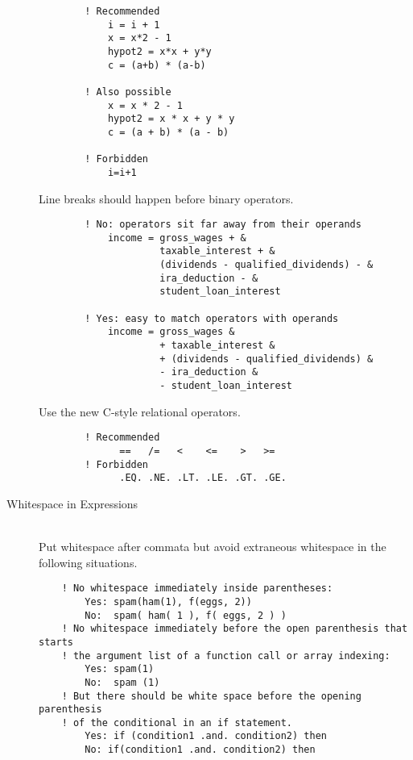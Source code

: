\documentclass[a4paper,notitlepage]{scrreprt}
\newcommand\headitem[1]{\needspace{1.5\baselineskip}\item[{\boldmath #1 \nopagebreak}] \hfill \\ \nopagebreak}
\begin{document}
\begin{description}
        \begin{lstlisting}
        ! Recommended
            i = i + 1
            x = x*2 - 1
            hypot2 = x*x + y*y
            c = (a+b) * (a-b)

        ! Also possible
            x = x * 2 - 1
            hypot2 = x * x + y * y
            c = (a + b) * (a - b)

        ! Forbidden
            i=i+1
        \end{lstlisting}

        Line breaks should happen before binary operators.
        \begin{lstlisting}
        ! No: operators sit far away from their operands
            income = gross_wages + &
                     taxable_interest + &
                     (dividends - qualified_dividends) - &
                     ira_deduction - &
                     student_loan_interest

        ! Yes: easy to match operators with operands
            income = gross_wages &
                     + taxable_interest &
                     + (dividends - qualified_dividends) &
                     - ira_deduction &
                     - student_loan_interest
        \end{lstlisting}

        Use the new C-style relational operators.
        \begin{lstlisting}
        ! Recommended
              ==   /=   <    <=    >   >=
        ! Forbidden
              .EQ. .NE. .LT. .LE. .GT. .GE.
        \end{lstlisting}

    \headitem{Whitespace in Expressions}
        Put whitespace after commata but
        avoid extraneous whitespace in the following situations.

        \begin{lstlisting}
    ! No whitespace immediately inside parentheses:
        Yes: spam(ham(1), f(eggs, 2))
        No:  spam( ham( 1 ), f( eggs, 2 ) )
    ! No whitespace immediately before the open parenthesis that starts
    ! the argument list of a function call or array indexing:
        Yes: spam(1)
        No:  spam (1)
    ! But there should be white space before the opening parenthesis
    ! of the conditional in an if statement.
        Yes: if (condition1 .and. condition2) then
        No: if(condition1 .and. condition2) then


\end{lstlisting}
\end{description}
\end{document}

